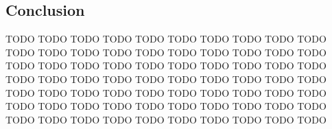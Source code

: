 \documentclass[runningheads,a4paper,oribibl]{llncs}
\begin{document}
\subsection{Conclusion}
TODO TODO TODO TODO TODO TODO TODO TODO TODO TODO TODO TODO TODO TODO TODO TODO TODO TODO TODO TODO TODO TODO TODO TODO TODO TODO TODO TODO TODO TODO TODO TODO TODO TODO TODO TODO TODO TODO TODO TODO TODO TODO TODO TODO TODO TODO TODO TODO TODO TODO TODO TODO TODO TODO TODO TODO TODO TODO TODO TODO TODO TODO TODO TODO TODO TODO TODO TODO TODO TODO



\end{document}
